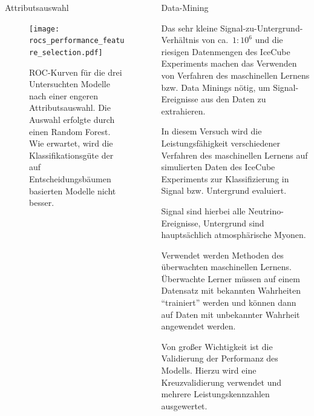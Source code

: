 \documentclass[t]{beamer}
\begin{document}
\begin{columns}[onlytextwidth]
\begin{column}{0.5\textwidth}
      \begin{block}[]{Attributsauswahl}
        \begin{multicols}{2}
          \begin{figure}
            \centering
            \texttt{[image: rocs\_performance\_feature\_selection.pdf]}
            \caption{ROC-Kurven für die drei Untersuchten Modelle nach einer
              engeren Attributsauswahl. Die Auswahl erfolgte durch einen Random Forest.
              Wie erwartet, wird die Klassifikationsgüte der auf Entscheidungsbäumen basierten Modelle nicht besser.}
            \label{fig:name}
          \end{figure}
          \begin{center}
            
          \end{center}
        \end{multicols}
      \end{block}
    \end{column}%
    \begin{column}{0.5\textwidth}%
      \begin{block}{Data-Mining}%
        \begin{multicols}{2}
          Das sehr kleine Signal-zu-Untergrund-Verhältnis von ca.\ $1:10^6$ und die
          riesigen Datenmengen des IceCube Experiments machen das
          Verwenden von Verfahren des maschinellen Lernens bzw. Data Minings nötig,
          um Signal-Ereignisse aus den Daten zu extrahieren.

          In diesem Versuch wird die Leistungsfähigkeit verschiedener Verfahren
          des maschinellen Lernens auf simulierten Daten des IceCube Experiments
          zur Klassifizierung in Signal bzw. Untergrund evaluiert.

          Signal sind hierbei alle Neutrino-Ereignisse, Untergrund sind hauptsächlich
          atmosphärische Myonen.

          Verwendet werden Methoden des überwachten maschinellen Lernens.
          Überwachte Lerner müssen auf einem Datensatz mit bekannten Wahrheiten
          \enquote{trainiert} werden und können dann auf Daten mit unbekannter
          Wahrheit angewendet werden.

          Von großer Wichtigkeit ist die Validierung der Performanz des Modells.
          Hierzu wird eine Kreuzvalidierung verwendet und mehrere Leistungskennzahlen
          ausgewertet.
        \end{multicols}
      \end{block}%


\end{column}
\end{columns}
\end{document}
